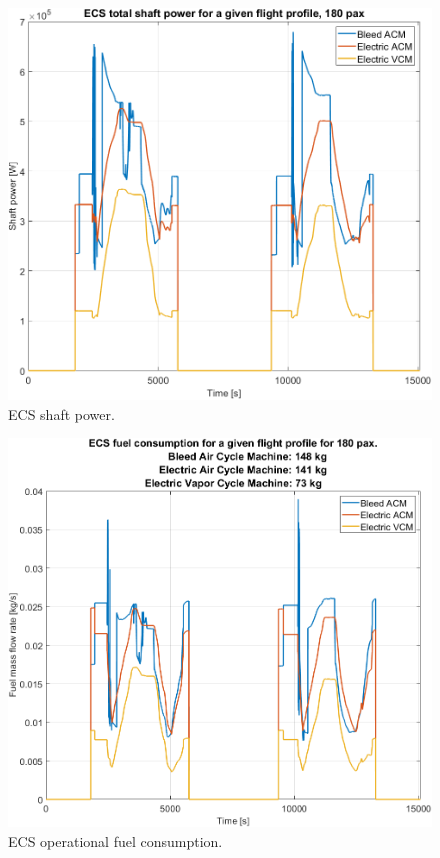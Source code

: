 \documentclass[english]{kththesis}
\begin{document}
\begin{figure}[!ht]
    \centering
    \includegraphics[width=1\textwidth]{Epictures/ECSShaftPower180pax.png}
    \caption{ECS shaft power.}
    \label{fig:ECSShaftPower}
\end{figure}

\begin{figure}[!ht]
    \centering
    \includegraphics[width=1\textwidth]{Epictures/ECSShaftPowerFuel.png}
    \caption{ECS operational fuel consumption.}
    \label{fig:ECSShaftPowerFuel}
\end{figure}
\end{document}
